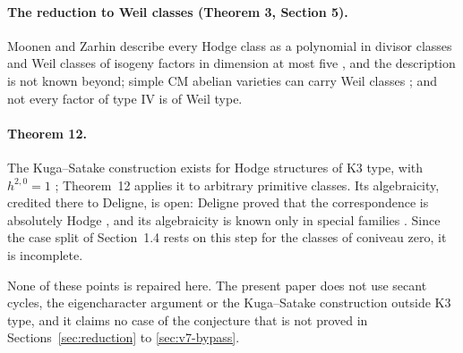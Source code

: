 \documentclass[11pt,reqno]{amsart}
\numberwithin{equation}{section}
\theoremstyle{plain}
\theoremstyle{definition}
\begin{document}
\paragraph{The reduction to Weil classes (Theorem 3, Section 5).} Moonen and Zarhin describe every Hodge class as a polynomial in divisor classes and Weil classes of isogeny factors in dimension at most five \cite{MZ99}, and the description is not known beyond; simple CM abelian varieties can carry Weil classes \cite{Weil77,Shi79b}; and not every factor of type IV is of Weil type.

\paragraph{Theorem 12.} The Kuga--Satake construction exists for Hodge structures of K3 type, with $h^{2,0}=1$ \cite{KS67,Del72}; Theorem~12 applies it to arbitrary primitive classes. Its algebraicity, credited there to Deligne, is open: Deligne proved that the correspondence is absolutely Hodge \cite{Del82}, and its algebraicity is known only in special families \cite{vG00,Var23}. Since the case split of Section~1.4 rests on this step for the classes of coniveau zero, it is incomplete.

None of these points is repaired here. The present paper does not use secant cycles, the eigencharacter argument or the Kuga--Satake construction outside K3 type, and it claims no case of the conjecture that is not proved in Sections~\ref{sec:reduction} to \ref{sec:v7-bypass}.
\end{document}
